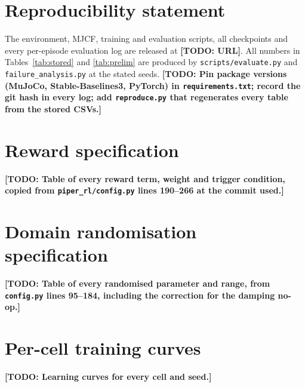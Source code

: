 \documentclass{article}
\newcommand{\todo}[1]{{\color{red}\textbf{[TODO: #1]}}}
\begin{document}
\section*{Reproducibility statement}
The environment, MJCF, training and evaluation scripts, all checkpoints and every per-episode evaluation log are released at \todo{URL}. All numbers in Tables~\ref{tab:stored} and \ref{tab:prelim} are produced by \texttt{scripts/evaluate.py} and \texttt{failure\_analysis.py} at the stated seeds. \todo{Pin package versions (MuJoCo, Stable-Baselines3, PyTorch) in \texttt{requirements.txt}; record the git hash in every log; add \texttt{reproduce.py} that regenerates every table from the stored CSVs.}




\appendix
\section{Reward specification}
\todo{Table of every reward term, weight and trigger condition, copied from \texttt{piper\_rl/config.py} lines 190--266 at the commit used.}

\section{Domain randomisation specification}
\todo{Table of every randomised parameter and range, from \texttt{config.py} lines 95--184, including the correction for the damping no-op.}

\section{Per-cell training curves}
\todo{Learning curves for every cell and seed.}
\end{document}
